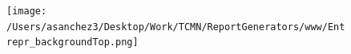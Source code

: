 \documentclass{article}\usepackage[]{graphicx}\usepackage[]{color}
\begin{document}
%

\begin{figure}
  \vspace{-3ex} %
\end{figure}

\begin{figure}
  \vspace{-3ex} %
  \texttt{[image: /Users/asanchez3/Desktop/Work/TCMN/ReportGenerators/www/Entrepr\_backgroundTop.png]}
\end{figure}
\end{document}
